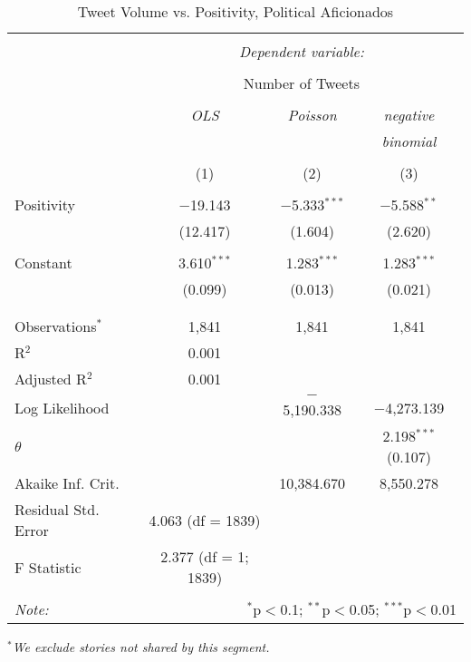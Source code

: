 \begin{table}[!htbp] \centering 
  \caption{Tweet Volume vs. Positivity, Political Aficionados} 
  \label{} 
    \begin{tabular}{@{\extracolsep{5pt}}lccc} 
    \\[-1.8ex]\hline 
    \hline \\[-1.8ex] 
     & \multicolumn{3}{c}{\textit{Dependent variable:}} \\ 
    \cline{2-4} 
    \\[-1.8ex] & \multicolumn{3}{c}{Number of Tweets} \\ 
    \\[-1.8ex] & \textit{OLS} & \textit{Poisson} & \textit{negative} \\ 
     & \textit{} & \textit{} & \textit{binomial} \\ 
    \\[-1.8ex] & (1) & (2) & (3)\\ 
    \hline \\[-1.8ex] 
     Positivity & $-$19.143 & $-$5.333$^{***}$ & $-$5.588$^{**}$ \\ 
      & (12.417) & (1.604) & (2.620) \\ 
      & & & \\ 
     Constant & 3.610$^{***}$ & 1.283$^{***}$ & 1.283$^{***}$ \\ 
      & (0.099) & (0.013) & (0.021) \\ 
      & & & \\ 
    \hline \\[-1.8ex] 
    Observations$^{*}$ & 1,841 & 1,841 & 1,841 \\ 
    R$^{2}$ & 0.001 &  &  \\ 
    Adjusted R$^{2}$ & 0.001 &  &  \\ 
    Log Likelihood &  & $-$5,190.338 & $-$4,273.139 \\ 
    $\theta$ &  &  & 2.198$^{***}$  (0.107) \\ 
    Akaike Inf. Crit. &  & 10,384.670 & 8,550.278 \\ 
    Residual Std. Error & 4.063 (df = 1839) &  &  \\ 
    F Statistic & 2.377 (df = 1; 1839) &  &  \\ 
    \hline 
    \hline \\[-1.8ex] 
    \textit{Note:}  & \multicolumn{3}{r}{$^{*}$p$<$0.1; $^{**}$p$<$0.05; $^{***}$p$<$0.01} \\ 
    \end{tabular} 
\end{table}
\emph{$^{*}$We exclude stories not shared by this segment.} 

\clearpage
\newpage 